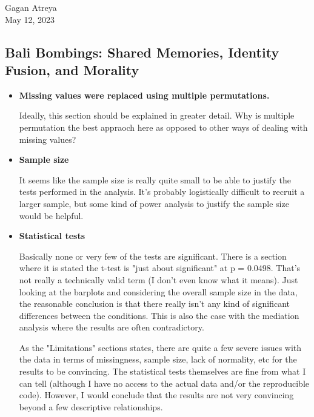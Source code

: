 \documentclass[12pt]{article}
\begin{document}
\onehalfspacing

\noindent
Gagan Atreya \\
May 12, 2023 

\subsection*{Bali Bombings: Shared Memories, Identity Fusion, and Morality}

\begin{itemize}

\item \textbf{Missing values were replaced using multiple permutations.} 

Ideally, this section should be explained in greater detail. Why is multiple permutation the best appraoch here as opposed to other ways of dealing with missing values?  

\item \textbf{Sample size}

It seems like the sample size is really quite small to be able to justify the tests performed in the analysis. It's probably logistically difficult to recruit a larger sample, but some kind of power analysis to justify the sample size would be helpful. 

\item \textbf{Statistical tests}

Basically none or very few of the tests are significant. There is a section where it is stated the t-test is "just about significant" at p = 0.0498. That's not really a technically valid term (I don't even know what it means). Just looking at the barplots and considering the overall sample size in the data, the reasonable conclusion is that there really isn't any kind of significant differences between the conditions. This is also the case with the mediation analysis where the results are often contradictory. 

As the "Limitations" sections states, there are quite a few severe issues with the data in terms of missingness, sample size, lack of normality, etc for the results to be convincing. The statistical tests themselves are fine from what I can tell (although I have no access to the actual data and/or the reproducible code). However, I would conclude that the results are not very convincing beyond a few descriptive relationships. 

\end{itemize}
\end{document}
